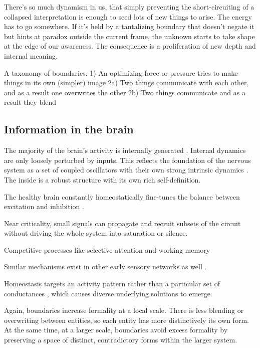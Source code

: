 There's so much dynamism in us, that simply preventing the short-circuiting of a collapsed interpretation is enough to seed lots of new things to arise. The energy has to go somewhere. If it's held by a tantalizing boundary that doesn't negate it but hints at paradox outside the current frame, the unknown starts to take shape at the edge of our awareness. The consequence is a proliferation of new depth and internal meaning.


A taxonomy of boundaries.
1) An optimizing force or pressure tries to make things in its own (simpler) image
2a) Two things communicate with each other, and as a result one overwrites the other
2b) Two things communicate and as a result they blend

\subsection{Information in the brain}


The majority of the brain's activity is internally generated \citep{raichle2006brain, buzsaki2006rhythms}. Internal dynamics are only loosely perturbed by inputs. This reflects the foundation of the nervous system as a set of coupled oscillators with their own strong intrinsic dynamics \citep{marder2001central, grillner1985neurobiological}. The inside is a robust structure with its own rich self-definition. 


The healthy brain constantly homeostatically fine-tunes the balance between excitation and inhibition \citep{shew2011information,haldeman2005critical,cocchi2017criticality}. 

Near criticality, small signals can propagate and recruit subsets of the circuit without driving the whole system into saturation or silence.

Competitive processes like selective attention and working memory \citep{goldman1995cellular, miller1996neural, brunel2001effects}

Similar mechanisms exist in other early sensory networks as well \citep{mountcastle1959neural, uchida2003speed}.
 
Homeostasis targets an activity pattern rather than a particular set of conductances \citep{o2013correlations}, which causes diverse underlying solutions to emerge. 



Again, boundaries increase formality at a local scale. There is less blending or overwriting between entities, so each entity has more distinctively its own form. At the same time, at a larger scale, boundaries avoid excess formality by preserving a space of distinct, contradictory forms within the larger system.


